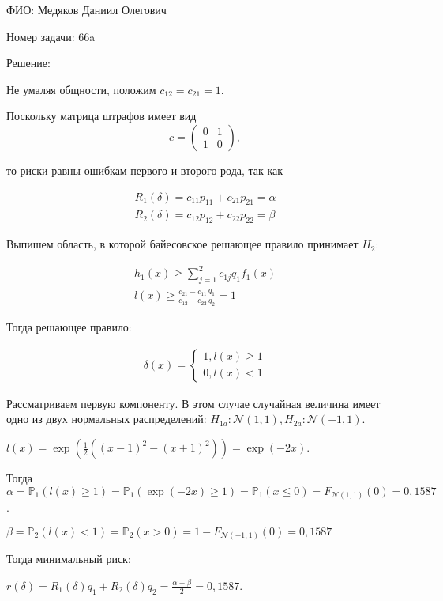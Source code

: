 \documentclass[14pt]{extarticle}
\begin{document}
ФИО: Медяков Даниил Олегович

\vspace{10pt}

Номер задачи: 66a

\vspace{10pt}

Решение:

\vspace{10pt}

Не умаляя общности, положим $c_{12} = c_{21} = 1$.

Поскольку матрица штрафов имеет вид 
\begin{equation*}
    c = 
    \begin{pmatrix}
      0& 1\\
      1& 0
    \end{pmatrix},
\end{equation*}

то риски равны ошибкам первого и второго рода, так как

\begin{gather*}
    R_1(\delta) = c_{11}p_{11} + c_{21}p_{21} = \alpha\\
    R_2(\delta) = c_{12}p_{12} + c_{22}p_{22} = \beta
\end{gather*}

Выпишем область, в которой байесовское решающее правило принимает $H_2$:

\begin{gather*}
    h_1(x) \geqslant \sum\limits_{j=1}^2 c_{1j}q_1f_1(x)\\
    l(x) \geqslant \frac{c_{21} - c_{11}}{c_{12} - c_{22}}\frac{q_1}{q_2} = 1
\end{gather*}

Тогда решающее правило:

\begin{gather*}
    \delta(x)=
    \begin{cases}
        1, l(x) \geqslant 1\\
        0, l(x) < 1
    \end{cases}
\end{gather*}

Рассматриваем первую компоненту. В этом случае случайная величина имеет одно из двух нормальных распределений: $H_{1a}: \mathcal{N}(1, 1), H_{2a}: \mathcal{N}(-1, 1)$.

$l(x) = \exp(\frac{1}{2}((x-1)^2 - (x+1)^2)) = \exp(-2x)$.

Тогда $\alpha = \mathbb P_1(l(x)\geqslant 1) = \mathbb P_1(\exp(-2x)\geqslant 1) = \mathbb P_1(x\leqslant 0) = F_{\mathcal{N}(1, 1)}(0) = 0,1587$.

$\beta = \mathbb P_2(l(x) < 1) = \mathbb P_2(x > 0) = 1 - F_{\mathcal{N}(-1, 1)}(0) = 0,1587$

Тогда минимальный риск:

$r(\delta) = R_1(\delta)q_1 + R_2(\delta)q_2 = \frac{\alpha + \beta}{2} = 0,1587$.
\end{document}
